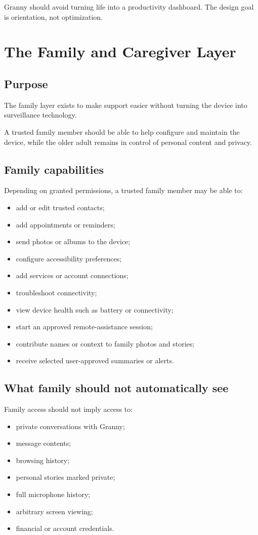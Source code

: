\documentclass[11pt]{article}
\begin{document}
Granny should avoid turning life into a productivity dashboard. The design goal is orientation, not optimization.

\section{The Family and Caregiver Layer}

\subsection{Purpose}
The family layer exists to make support easier without turning the device into surveillance technology.

A trusted family member should be able to help configure and maintain the device, while the older adult remains in control of personal content and privacy.

\subsection{Family capabilities}
Depending on granted permissions, a trusted family member may be able to:

\begin{itemize}[leftmargin=*]
    \item add or edit trusted contacts;
    \item add appointments or reminders;
    \item send photos or albums to the device;
    \item configure accessibility preferences;
    \item add services or account connections;
    \item troubleshoot connectivity;
    \item view device health such as battery or connectivity;
    \item start an approved remote-assistance session;
    \item contribute names or context to family photos and stories;
    \item receive selected user-approved summaries or alerts.
\end{itemize}

\subsection{What family should not automatically see}
Family access should not imply access to:

\begin{itemize}[leftmargin=*]
    \item private conversations with Granny;
    \item message contents;
    \item browsing history;
    \item personal stories marked private;
    \item full microphone history;
    \item arbitrary screen viewing;
    \item financial or account credentials.
\end{itemize}
\end{document}
